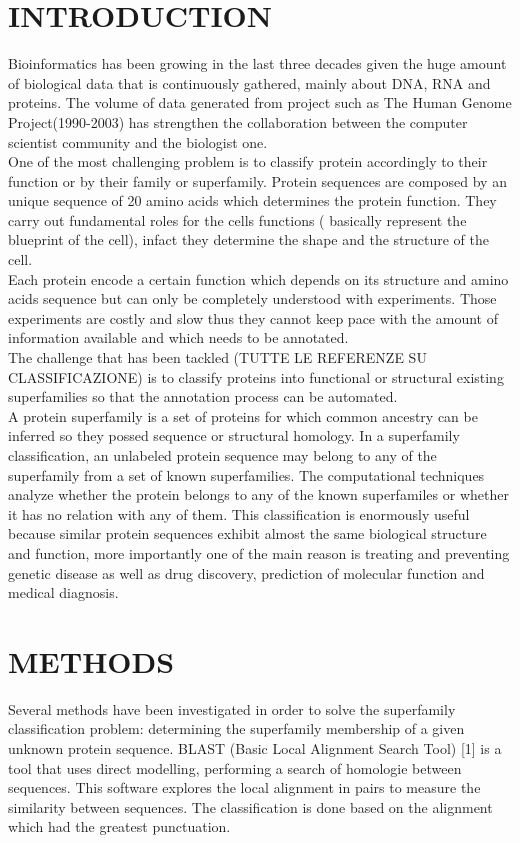 \documentclass[a4paper, 10pt, conference]{ieeeconf}      %
\begin{document}
\section{INTRODUCTION}
Bioinformatics has been growing in the last three decades\cite{Efficient} given the huge amount of biological data that is continuously gathered, mainly about DNA, RNA and proteins. The volume of data generated from project such as The Human Genome Project\cite{human}(1990-2003) has strengthen the collaboration between the computer scientist community and the biologist one.\\
One of the most challenging problem is to classify protein accordingly to their function or by their family or superfamily. Protein sequences are composed by an unique sequence of 20 amino acids which determines the protein function. They carry out fundamental roles for the cells functions ( basically represent the blueprint of the cell), infact they determine the shape and the structure of the cell.\\ Each protein encode a certain function which depends on its structure and amino acids sequence but can only be completely understood with experiments. Those experiments are costly and slow thus they cannot keep pace with the amount of information available and which needs to be annotated.\\
The challenge that has been tackled (TUTTE LE REFERENZE SU CLASSIFICAZIONE) is to classify proteins into functional or structural existing superfamilies so that the annotation process can be automated. \\  
A protein superfamily is a set of proteins for which common ancestry can be inferred so they possed sequence or structural homology. 
In a superfamily classification, an unlabeled protein sequence may belong
to any of the superfamily from a set of known superfamilies. The computational techniques analyze whether the protein belongs to any of the known superfamiles or whether it has no relation with any of them. This classification is enormously useful because similar protein sequences exhibit almost the same biological structure and function, more importantly one of the main reason is treating and preventing genetic disease as well as drug discovery, prediction of molecular function and medical diagnosis.

\section{METHODS}
Several methods have been investigated in order to solve the superfamily classification problem: determining the superfamily membership of a given unknown protein sequence.
BLAST (Basic Local Alignment Search Tool) [1] is a
tool that uses direct modelling, performing a search of homologie
between sequences. This software explores the local
alignment in pairs to measure the similarity between sequences.
The classification is done based on the alignment
which had the greatest punctuation.
\end{document}
